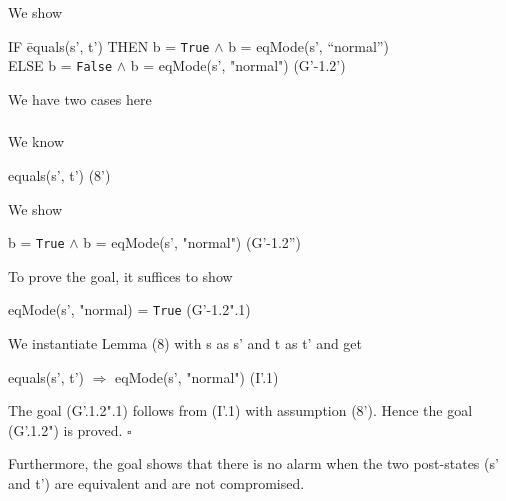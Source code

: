 \documentclass[conference]{IEEEtran}
\begin{document}
\noindent We show
\begin{center}
\begin{tabbing}
IF \=equals(s', t')  THEN b = \texttt{True} $\wedge$ b = eqMode(s', ``normal'')
\\ELSE b = \texttt{False} $\wedge$ b = eqMode(s', "normal")
  \hspace*{1cm} (G'-1.2')
 \end{tabbing}
\end{center}

\noindent We have two cases here

\subsubsection*{}

\noindent We know

\begin{center}
equals(s', t')  \hspace*{1.5cm} (8')
\end{center}

\noindent We show
\begin{center}
 b = \texttt{True} $\wedge$ b = eqMode(s', "normal")  \hspace*{1cm} (G'-1.2'')
\end{center}

\noindent To prove the goal, it suffices to show

\begin{center}
eqMode(s', "normal) = \texttt{True}  \hspace*{2.5cm} (G'-1.2".1)
\end{center}

\noindent We instantiate Lemma (8) with
s as s' and t as t' and get

\begin{center}
equals(s', t') $\Rightarrow$ eqMode(s', "normal")  \hspace*{1cm} (I'.1)
\end{center}

The goal (G'.1.2".1) follows from (I'.1) with assumption (8'). Hence the goal (G'.1.2") is proved. $\square$

Furthermore, the goal shows that there is no alarm when the two post-states (s' and t') are
equivalent and are not compromised.

\subsubsection*{} 
\end{document}
